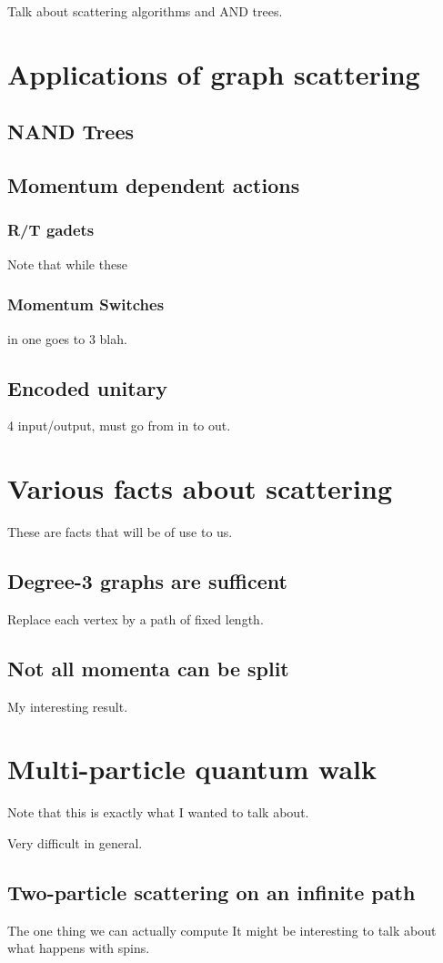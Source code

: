 \documentclass[../thesis-main/thesis-main]{subfiles}
\begin{document}
Talk about scattering algorithms and AND trees.

\section{Applications of graph scattering}

\subsection{NAND Trees}

\subsection{Momentum dependent actions}

\subsubsection{R/T gadets}
Note that while these 

\subsubsection{Momentum Switches}

in one goes to 3 blah.

\subsection{Encoded unitary}


4 input/output, must go from in to out.

\section{Various facts about scattering}

These are facts that will be of use to us.

\subsection{Degree-3 graphs are sufficent}

Replace each vertex by a path of fixed length.

\subsection{Not all momenta can be split}

My interesting result.

\section{Multi-particle quantum walk}

Note that this is exactly what I wanted to talk about.

Very difficult in general.

\subsection{Two-particle scattering on an infinite path}

The one thing we can actually compute
It might be interesting to talk about what happens with spins.
\end{document}

